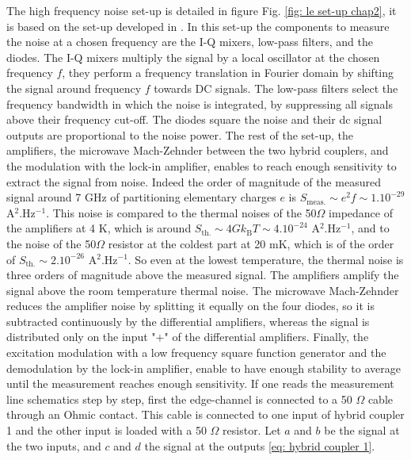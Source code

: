 The high frequency noise set-up is detailed in figure Fig. \ref{fig: le set-up chap2}, it is based on the set-up developed in \cite{parmentier2011high,parmentier2010short,engelbrecht1965wide,bisognin2019microwave}.
In this set-up the components to measure the noise at a chosen frequency are the I-Q mixers, low-pass filters, and the diodes.
The I-Q mixers multiply the signal by a local oscillator at the chosen frequency $f$, they perform a frequency translation in Fourier domain by shifting the signal around frequency $f$ towards DC signals.
The low-pass filters select the frequency bandwidth in which the noise is integrated, by suppressing all signals above their frequency cut-off.
The diodes square the noise and their dc signal outputs are proportional to the noise power.
The rest of the set-up, the amplifiers, the microwave Mach-Zehnder between the two hybrid couplers, and the modulation with the lock-in amplifier, enables to reach enough sensitivity to extract the signal from noise.
Indeed the order of magnitude of the measured signal around 7 GHz of partitioning elementary charges $e$ is $S_{\mathrm{meas.}} \sim e^{2}f \sim 1.10^{-29}$ A$^{2}.$Hz$^{-1}$.
This noise is compared to the thermal noises of the 50$\Omega$ impedance of the amplifiers at 4 K, which is around $S_{\mathrm{th.}} \sim 4Gk_{\mathrm{B}}T \sim 4.10^{-24}$ A$^{2}.$Hz$^{-1}$, and to the noise of the 50$\Omega$ resistor at the coldest part at 20 mK, which is of the order of $S_{\mathrm{th.}} \sim 2.10^{-26}$ A$^{2}.$Hz$^{-1}$.
So even at the lowest temperature, the thermal noise is three orders of magnitude above the measured signal.
The amplifiers amplify the signal above the room temperature thermal noise.
The microwave Mach-Zehnder reduces the amplifier noise by splitting it equally on the four diodes, so it is subtracted continuously by the differential amplifiers, whereas the signal is distributed only on the input "$+$" of the differential amplifiers.
Finally, the excitation modulation with a low frequency square function generator and the demodulation by the lock-in amplifier, enable to have enough stability to average until the measurement reaches enough sensitivity.
If one reads the measurement line schematics step by step, first the edge-channel is connected to a 50 $\Omega$ cable through an Ohmic contact.
This cable is connected to one input of hybrid coupler 1 and the other input is loaded with a 50 $\Omega$ resistor.
Let $a$ and $b$ be the signal at the two inputs, and $c$ and $d$ the signal at the outputs \eqref{eq: hybrid coupler 1}.


